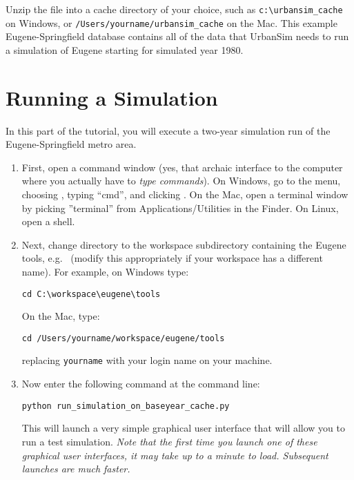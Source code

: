 \documentclass{howto}
\begin{document}
Unzip the file into a cache
directory of your choice, such as \verb|c:\urbansim_cache| on Windows, or 
\verb|/Users/yourname/urbansim_cache| on the Mac. This example 
Eugene-Springfield database contains all of the data that UrbanSim needs to 
run a simulation of Eugene starting for simulated year 1980.

\section*{Running a Simulation}

In this part of the tutorial, you will execute a two-year simulation run of the
Eugene-Springfield metro area.

\begin{enumerate}

\item First, open a command window (yes, that archaic interface to the
computer where you actually have to \emph{type commands}). 
On Windows, go to the  menu, choosing
, typing ``cmd'', and clicking .  On the Mac,
open a terminal window by picking ''terminal'' from Applications/Utilities in the Finder.
On Linux, open a shell.

\item Next, change directory to the workspace subdirectory containing
the Eugene tools, e.g.\
(modify this appropriately if your workspace has a different name).
For example, on Windows type:

\begin{verbatim}
cd C:\workspace\eugene\tools
\end{verbatim}

On the Mac, type:
\begin{verbatim}
cd /Users/yourname/workspace/eugene/tools
\end{verbatim}
replacing {\tt yourname} with your login name on your machine.

\item Now enter the following command at the command line:

\begin{verbatim}
python run_simulation_on_baseyear_cache.py
\end{verbatim}

This will launch a very simple graphical user interface that will allow you to
run a test simulation.  \emph{Note that the first time you launch one of these
graphical user interfaces, it may take up to a minute to load.  Subsequent
launches are much faster.}


\end{enumerate}
\end{document}
